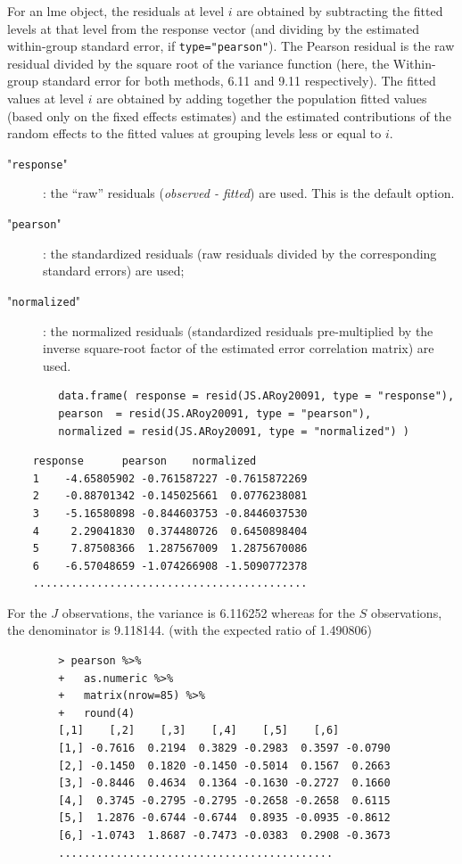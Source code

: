 \documentclass[12pt, a4paper]{report}
\theoremstyle{plain}
\theoremstyle{definition}
\theoremstyle{remark}
\begin{document}
	For an lme object, the residuals at level $i$ are obtained by subtracting the fitted levels at that level from the response vector (and dividing by the estimated within-group standard error, if \texttt{type="pearson"}). The Pearson residual is the raw residual divided by the square root of the variance function (here, the Within-group standard error for both methods, 6.11 and 9.11 respectively). The fitted values at level $i$ are obtained by adding together the population fitted values (based only on the fixed effects estimates) and the estimated contributions of the random effects to the fitted values at grouping levels less or equal to $i$.
	
	\begin{description}
		\item["\texttt{response}"]: the “raw” residuals (\textit{observed - fitted}) are used. This is the default option.
		\item["\texttt{pearson}"]: the standardized residuals (raw residuals divided by the corresponding standard errors) are used; 
		\item["\texttt{normalized}"]: the normalized residuals (standardized residuals pre-multiplied by the inverse square-root factor of the estimated error correlation matrix) are used.
	\end{description}
	
	\begin{framed}
		\begin{verbatim}
		data.frame( response = resid(JS.ARoy20091, type = "response"), 
		pearson  = resid(JS.ARoy20091, type = "pearson"), 
		normalized = resid(JS.ARoy20091, type = "normalized") )
		\end{verbatim}
	\end{framed}
	
	\begin{verbatim}
	response      pearson    normalized
	1    -4.65805902 -0.761587227 -0.7615872269
	2    -0.88701342 -0.145025661  0.0776238081
	3    -5.16580898 -0.844603753 -0.8446037530
	4     2.29041830  0.374480726  0.6450898404
	5     7.87508366  1.287567009  1.2875670086
	6    -6.57048659 -1.074266908 -1.5090772378
	...........................................
	\end{verbatim}
	For the $J$ observations, the variance is 6.116252 whereas for the $S$ observations, the denominator is 9.118144. (with the expected ratio of  1.490806)
	
	
	\begin{framed}
		\begin{verbatim}
		> pearson %>%
		+   as.numeric %>% 
		+   matrix(nrow=85) %>%
		+   round(4) 
		[,1]    [,2]    [,3]    [,4]    [,5]    [,6]
		[1,] -0.7616  0.2194  0.3829 -0.2983  0.3597 -0.0790
		[2,] -0.1450  0.1820 -0.1450 -0.5014  0.1567  0.2663
		[3,] -0.8446  0.4634  0.1364 -0.1630 -0.2727  0.1660
		[4,]  0.3745 -0.2795 -0.2795 -0.2658 -0.2658  0.6115
		[5,]  1.2876 -0.6744 -0.6744  0.8935 -0.0935 -0.8612
		[6,] -1.0743  1.8687 -0.7473 -0.0383  0.2908 -0.3673
		...........................................
		
		\end{verbatim}
	\end{framed}
	
\end{document}
